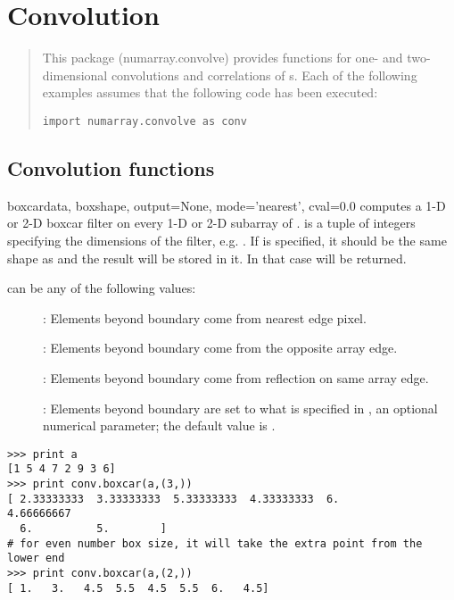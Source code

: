 \chapter{Convolution}
\label{cha:convolve}

\makeatletter
\py@reset
\makeatother

\begin{quote}
   This package (numarray.convolve) provides functions for one- and 
   two-dimensional convolutions and correlations of s.
   Each of the following examples assumes that the following code has been 
   executed:
\begin{verbatim}
import numarray.convolve as conv
\end{verbatim}
\end{quote}


\section{Convolution functions}
\label{sec:CONV:convolution-functions}

\begin{funcdesc}{boxcar}{data, boxshape, output=None, mode='nearest', cval=0.0}
    computes a 1-D or 2-D boxcar filter on every 1-D or
   2-D subarray of .  is a tuple of integers
   specifying the dimensions of the filter, e.g. .  If
    is specified, it should be the same shape as
    and the result will be stored in it.  In that case
    will be returned.
        
    can be any of the following values:
   \begin{description}
   \item[]: Elements beyond boundary come from nearest edge pixel.
   \item[]: Elements beyond boundary come from the opposite array
      edge.
   \item[]: Elements beyond boundary come from reflection on same
      array edge.
   \item[]: Elements beyond boundary are set to what is specified
      in , an optional numerical parameter; the default value is
      .
   \end{description}        
\end{funcdesc}
\begin{verbatim}
>>> print a
[1 5 4 7 2 9 3 6]
>>> print conv.boxcar(a,(3,))
[ 2.33333333  3.33333333  5.33333333  4.33333333  6.          4.66666667
  6.          5.        ]
# for even number box size, it will take the extra point from the lower end
>>> print conv.boxcar(a,(2,))
[ 1.   3.   4.5  5.5  4.5  5.5  6.   4.5]
\end{verbatim}

